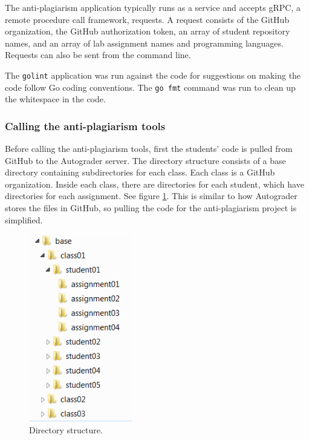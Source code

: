\documentclass[10pt,journal,compsoc]{IEEEtran}
\begin{document}
		The anti-plagiarism application typically runs as a service and accepts gRPC, a remote procedure call framework, requests. A request consists of the GitHub organization, the GitHub authorization token, an array of student repository names, and an array of lab assignment names and programming languages. Requests can also be sent from the command line.
		
		The \verb|golint| application was run against the code for suggestions on making the code follow Go coding conventions. The \verb|go fmt| command was run to clean up the whitespace in the code.
	
			\subsubsection{Calling the anti-plagiarism tools}
			Before calling the anti-plagiarism tools, first the students' code is pulled from GitHub to the Autograder server. The directory structure consists of a base directory containing subdirectories for each class. Each class is a GitHub organization. Inside each class, there are directories for each student, which have directories for each assignment. See figure \ref{fig:directories}. This is similar to how Autograder stores the files in GitHub, so pulling the code for the anti-plagiarism project is simplified.
	
			\begin{figure}[h!]
				\includegraphics[width=0.4\textwidth]{Directories.png}
				\caption{Directory structure.}
				\label{fig:directories}
			\end{figure}
			
\end{document}
